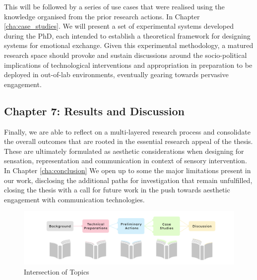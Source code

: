 This will be followed by a series of use cases that were realised using the knowledge organised from the prior research actions. In Chapter \ref{cha:case_studies}. We will present a set of experimental systems developed during the PhD, each intended to establish a theoretical framework for designing systems for emotional exchange. Given this experimental methodology, a matured research space should provoke and sustain discussions around the socio-political implications of technological interventions and appropriation in preparation to be deployed in out-of-lab environments, eventually gearing towards pervasive engagement.

\subsection{Chapter 7: Results and Discussion}

Finally, we are able to reflect on a multi-layered research process and consolidate the overall outcomes that are rooted in the essential research appeal of the thesis. These are ultimately formulated as aesthetic considerations when designing for sensation, representation and communication in context of sensory intervention. In Chapter \ref{cha:conclusion} We open up to some the major limitations present in our work, disclosing the additional paths for investigation that remain unfulfilled, closing the thesis with a call for future work in the push towards aesthetic engagement with communication technologies.

\begin{figure}[htbp]
	\centering
	\includegraphics[width=1.0\textwidth]{Chapters/Figures/background/Sec1_Thesis_Structure}
	\caption{Intersection of Topics}
	\label{fig:Concept_Venn}
\end{figure}

